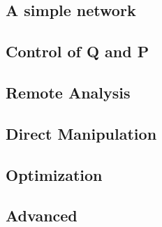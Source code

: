 \subsection{A simple network}


\subsection{Control of Q and P}


\subsection{Remote Analysis}


\subsection{Direct Manipulation}


\subsection{Optimization}


\subsection{Advanced}